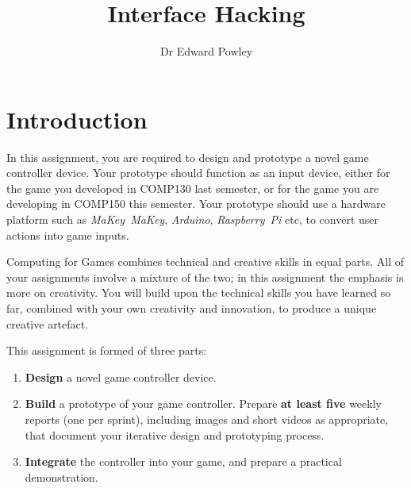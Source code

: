 \documentclass{../fal_assignment}
\title{Interface Hacking}
\author{Dr Edward Powley}
\begin{document}
\maketitle
%    
\section*{Introduction}

In this assignment, you are required to design and prototype a novel game controller device.
Your prototype should function as an input device, either for the game you developed in COMP130 last semester,
or for the game you are developing in COMP150 this semester.
Your prototype should use a hardware platform such as \emph{MaKey~MaKey}, \emph{Arduino}, \emph{Raspberry~Pi} etc,
to convert user actions into game inputs.

Computing for Games combines technical and creative skills in equal parts.
All of your assignments involve a mixture of the two;
in this assignment the emphasis is more on creativity.
You will build upon the technical skills you have learned so far,
combined with your own creativity and innovation,
to produce a unique creative artefact.

This assignment is formed of three parts:

\begin{enumerate}[label=\Alph*.]
    \item \textbf{Design} a novel game controller device.
    \item \textbf{Build} a prototype of your game controller.
        Prepare \textbf{at least five} weekly reports (one per sprint),
        including images and short videos as appropriate, that document your iterative design and prototyping process.
    \item \textbf{Integrate} the controller into your game, and prepare a practical demonstration.
\end{enumerate}
\end{document}
